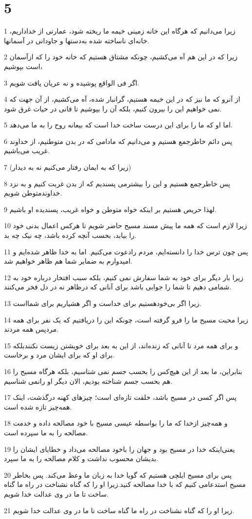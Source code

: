 \chapter{5}

\par 1 زیرا می‌دانیم که هرگاه این خانه زمینی خیمه ما ریخته شود، عمارتی از خداداریم، خانه‌ای ناساخته شده به‌دستها و جاودانی در آسمانها.
\par 2 زیرا که در این هم آه می‌کشیم، چونکه مشتاق هستیم که خانه خود را که ازآسمان است بپوشیم،
\par 3 اگر فی الواقع پوشیده و نه عریان یافت شویم.
\par 4 از آنرو که ما نیز که در این خیمه هستیم، گرانبار شده، آه می‌کشیم، از آن جهت که نمی خواهیم این را بیرون کنیم، بلکه آن را بپوشیم تا فانی در حیات غرق شود.
\par 5 اما او که ما را برای این درست ساخت خدا است که بیعانه روح را به ما می‌دهد.
\par 6 پس دائم خاطرجمع هستیم و می‌دانیم که مادامی که در بدن متوطنیم، از خداوند غریب می‌باشیم.
\par 7 (زیرا که به ایمان رفتار می‌کنیم نه به دیدار)
\par 8 پس خاطرجمع هستیم و این را بیشترمی پسندیم که از بدن غربت کنیم و به نزد خداوندمتوطن شویم.
\par 9 لهذا حریص هستیم بر اینکه خواه متوطن و خواه غریب، پسندیده او باشیم.
\par 10 زیرا لازم است که همه ما پیش مسند مسیح حاضر شویم تا هرکس اعمال بدنی خود را بیابد، بحسب آنچه کرده باشد، چه نیک چه بد.
\par 11 پس چون ترس خدا را دانسته‌ایم، مردم رادعوت می‌کنیم. اما به خدا ظاهر شده‌ایم و امیدوارم به ضمایر شما هم ظاهر خواهیم شد.
\par 12 زیرا بار دیگر برای خود به شما سفارش نمی کنیم، بلکه سبب افتخار درباره خود به شمامی دهیم تا شما را جوابی باشد برای آنانی که درظاهر نه در دل فخر می‌کنند.
\par 13 زیرا اگر بی‌خودهستیم برای خداست و اگر هشیاریم برای شمااست.
\par 14 زیرا محبت مسیح ما را فرو گرفته است، چونکه این را دریافتیم که یک نفر برای همه مردپس همه مردند.
\par 15 و برای همه مرد تا آنانی که زنده‌اند، از این به بعد برای خویشتن زیست نکنندبلکه برای او که برای ایشان مرد و برخاست.
\par 16 بنابراین، ما بعد از این هیچ‌کس را بحسب جسم نمی شناسیم، بلکه هرگاه مسیح را هم بحسب جسم شناخته بودیم، الان دیگر او رانمی شناسیم.
\par 17 پس اگر کسی در مسیح باشد، خلقت تازه‌ای است؛ چیزهای کهنه درگذشت، اینک همه‌چیز تازه شده است.
\par 18 و همه‌چیز ازخدا که ما را بواسطه عیسی مسیح با خود مصالحه داده و خدمت مصالحه را به ما سپرده است.
\par 19 یعنی‌اینکه خدا در مسیح بود و جهان را باخود مصالحه می‌داد و خطایای ایشان را بدیشان محسوب نداشت و کلام مصالحه را به ما سپرد.
\par 20 پس برای مسیح ایلچی هستیم که گویا خدا به زبان ما وعظ می‌کند. پس بخاطر مسیح استدعامی کنیم که با خدا مصالحه کنید.زیرا او را که گناه نشناخت در راه ما گناه ساخت تا ما در وی عدالت خدا شویم.
\par 21 زیرا او را که گناه نشناخت در راه ما گناه ساخت تا ما در وی عدالت خدا شویم.

